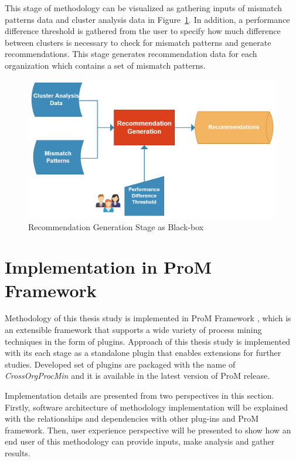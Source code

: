 This stage of methodology can be visualized as gathering inputs of mismatch patterns data and cluster analysis data in Figure~\ref{fig:recommendation-generation-blackox}. In addition, a performance difference threshold is gathered from the user to specify how much difference between clusters is necessary to check for mismatch patterns and generate recommendations. This stage generates recommendation data for each organization which contains a set of mismatch patterns.
\begin{figure}
  \centering
  \includegraphics[width=\textwidth]{4_methodology/recommendation-generation-blackbox}
  \caption{Recommendation Generation Stage as Black-box}
  \label{fig:recommendation-generation-blackox}
\end{figure}

\pagebreak


\section{Implementation in ProM Framework}
\label{sec:implementation}
Methodology of this thesis study is implemented in ProM Framework \cite{verbeek2010prom}, which is an extensible framework that supports a wide variety of process mining techniques in the form of plugins. Approach of this thesis study is implemented with its each stage as a standalone plugin that enables extensions for further studies. Developed set of plugins are packaged with the name of \textit{CrossOrgProcMin} and it is available in the latest version of ProM release. 


Implementation details are presented from two perspectives in this section. Firstly, software architecture of methodology implementation will be explained with the relationships and dependencies with other plug-ins and ProM framework. Then, user experience perspective will be presented to show how an end user of this methodology can provide inputs, make analysis and gather results. 

